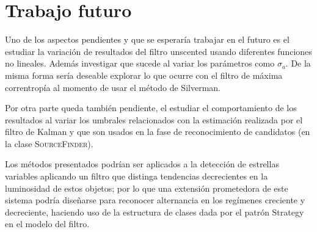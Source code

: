\section{Trabajo futuro}

Uno de los aspectos pendientes y que se esperar\'ia trabajar en el futuro es el estudiar la variaci\'on de resultados del filtro unscented usando diferentes funciones no lineales. Adem\'as investigar que sucede al variar los par\'ametros como $\sigma_a$. De la misma forma ser\'ia deseable explorar lo que ocurre con el filtro de m\'axima correntrop\'ia al momento de usar el m\'etodo de Silverman.
\bigskip

Por otra parte queda tambi\'en pendiente, el estudiar el comportamiento de los resultados al variar los umbrales relacionados con la estimaci\'on realizada por el filtro de Kalman y que son usados en la fase de reconocimiento de candidatos (en la clase \textsc{SourceFinder}).
\bigskip

Los m\'etodos presentados podr\'ian ser aplicados a la detecci\'on de estrellas variables aplicando un filtro que distinga tendencias decrecientes en la luminosidad de estos objetos; por lo que una extensi\'on prometedora de este sistema podr\'ia dise\~narse  para reconocer alternancia en los reg\'imenes creciente y decreciente, haciendo uso de la estructura de clases dada por el patr\'on Strategy en el modelo del filtro.
\bigskip



